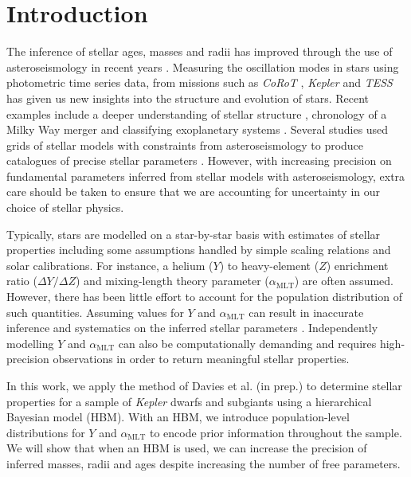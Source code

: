 \documentclass[a4paper,fleqn,usenatbib]{mnras}
\newcommand{\mlt}{\ensuremath{{\alpha_\mathrm{MLT}}}}
\begin{document}

\section{Introduction}


The inference of stellar ages, masses and radii has improved through the use of asteroseismology in recent years \citep[e.g. see the review by][]{Chaplin.Miglio2013}. Measuring the oscillation modes in stars using photometric time series data, from missions such as \emph{CoRoT} \citep{Baglin.Auvergne.ea2006}, \emph{Kepler} \citep{Borucki.Koch.ea2010} and \emph{TESS} \citep{Ricker.Winn.ea2015} has given us new insights into the structure and evolution of stars. Recent examples include a deeper understanding of stellar structure \citep{Verma.Raodeo.ea2017}, chronology of a Milky Way merger \citep{Chaplin.Serenelli.ea2020} and classifying exoplanetary systems \citep{Huber.Chaplin.ea2019}. Several studies used grids of stellar models with constraints from asteroseismology to produce catalogues of precise stellar parameters \citep{Pinsonneault.Elsworth.ea2014, SilvaAguirre.Lund.ea2017}. However, with increasing precision on fundamental parameters inferred from stellar models with asteroseismology, extra care should be taken to ensure that we are accounting for uncertainty in our choice of stellar physics.

Typically, stars are modelled on a star-by-star basis with estimates of stellar properties including some assumptions handled by simple scaling relations and solar calibrations. %
For instance, a helium ($Y$) to heavy-element ($Z$) enrichment ratio ($\Delta Y / \Delta Z$) and mixing-length theory parameter ($\mlt$) are often assumed. However, there has been little effort to account for the population distribution of such quantities. Assuming values for $Y$ and $\mlt$ can result in inaccurate inference and systematics on the inferred stellar parameters \citep{Valle.DellOmodarme.ea2015}. Independently modelling $Y$ and $\mlt$ can also be computationally demanding and requires high-precision observations in order to return meaningful stellar properties.

In this work, we apply the method of Davies et al. (in prep.) to determine stellar properties for a sample of \emph{Kepler} dwarfs and subgiants using a hierarchical Bayesian model (HBM). With an HBM, we introduce population-level distributions for $Y$ and $\mlt$ to encode prior information throughout the sample. We will show that when an HBM is used, we can increase the precision of inferred masses, radii and ages despite increasing the number of free parameters.
\end{document}
